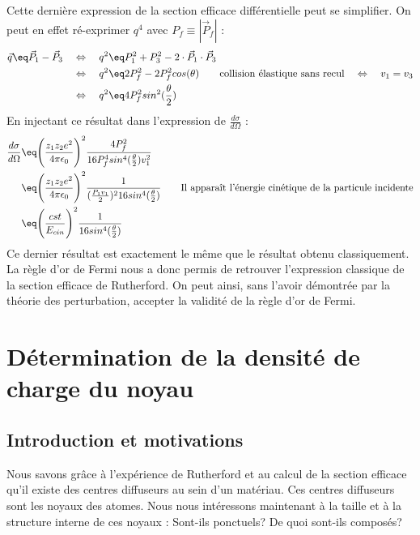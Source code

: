 Cette dernière expression de la section efficace différentielle peut se simplifier. On peut en effet ré-exprimer $q^4$ avec $P_f \equiv |\vec{P}_f|$ :
\begin{align*}
    \vec{q} \eq \vec{P}_1 - \vec{P}_3
        &\quad \Leftrightarrow \quad
    q^2 \eq P_1^2 + P_3^2 - 2 \cdot \vec{P}_1 \cdot \vec{P}_3\\
        &\quad \Leftrightarrow \quad
    q^2 \eq 2 P_f^2 - 2 P_f^2 cos(\theta)
    \qquad \text{collision élastique sans recul} \quad \Leftrightarrow \quad v_1=v_3\\
        &\quad \Leftrightarrow \quad
    q^2 \eq 4 P_f^2 sin^2(\frac{\theta}{2})
\end{align*}
En injectant ce résultat dans l'expression de  $\frac{d\sigma}{d\Omega}$ :
\begin{align*}
    \dfrac{d\sigma}{d\Omega}
        &\eq
    \Bigg( \dfrac{z_1 z_2e^2}{4\pi\epsilon_0} \Bigg)^2 
    \dfrac{4 P_f^2}{16 P_f^4 sin^4(\frac{\theta}{2})v^2_1}\\
        &\eq
    \Bigg( \dfrac{z_1 z_2e^2}{4\pi\epsilon_0} \Bigg)^2
    \dfrac{1}{ (\frac{P_1v_1}{2})^2 16sin^4(\frac{\theta}{2})}
    \qquad \text{Il apparaît l'énergie cinétique de la particule incidente}\\
    &\eq
    \Bigg( \dfrac{cst}{E_{cin}} \Bigg)^2
    \dfrac{1}{16sin^4(\frac{\theta}{2})}
\end{align*}
Ce dernier résultat est exactement le même que le résultat obtenu classiquement. La règle d'or de Fermi nous a donc permis de retrouver l'expression classique de la section efficace de Rutherford. On peut ainsi, sans l'avoir démontrée par la théorie des perturbation, accepter la validité de la règle d'or de Fermi.





\section{Détermination de la densité de charge du noyau}

\subsection{Introduction et motivations}

Nous savons grâce à l'expérience de Rutherford et au calcul de la section efficace qu'il existe des centres diffuseurs au sein d'un matériau. Ces centres diffuseurs sont les noyaux des atomes. Nous nous intéressons maintenant à la taille et à la structure interne de ces noyaux : Sont-ils ponctuels? De quoi sont-ils composés?\\

